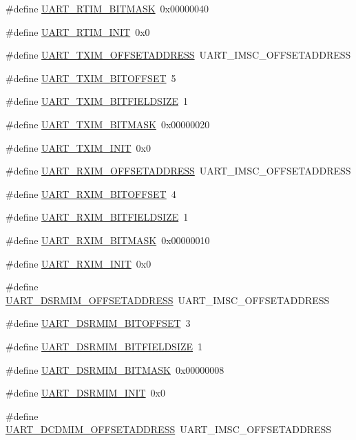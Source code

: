 \begin{DoxyCompactItemize}
\item 
\#define \hyperlink{a00575_ad7bf00b60838c3dfd9218e9eeca7b0ec}{UART\_\-RTIM\_\-BITMASK}~0x00000040
\item 
\#define \hyperlink{a00575_a3d1a7f72310c5ce29ef70199e4128b2e}{UART\_\-RTIM\_\-INIT}~0x0
\item 
\#define \hyperlink{a00575_aa73197a589b4d692d8a5d90ac7111316}{UART\_\-TXIM\_\-OFFSETADDRESS}~UART\_\-IMSC\_\-OFFSETADDRESS
\item 
\#define \hyperlink{a00575_a9732269606e7783cc0ff873d246391bd}{UART\_\-TXIM\_\-BITOFFSET}~5
\item 
\#define \hyperlink{a00575_adcd7b6190dd0ad984e4ee8e185bd4dc2}{UART\_\-TXIM\_\-BITFIELDSIZE}~1
\item 
\#define \hyperlink{a00575_a4b5adaed0f55f3503e76eb8ec0adc351}{UART\_\-TXIM\_\-BITMASK}~0x00000020
\item 
\#define \hyperlink{a00575_aa63c184a5b6142f51df0dacda54d49a8}{UART\_\-TXIM\_\-INIT}~0x0
\item 
\#define \hyperlink{a00575_adea6a35f8f1d9bd17d594651a9500feb}{UART\_\-RXIM\_\-OFFSETADDRESS}~UART\_\-IMSC\_\-OFFSETADDRESS
\item 
\#define \hyperlink{a00575_ad1d8486b526aa57a5d0b19a34b76f5cd}{UART\_\-RXIM\_\-BITOFFSET}~4
\item 
\#define \hyperlink{a00575_afc1f7641db425412c48a850e80047096}{UART\_\-RXIM\_\-BITFIELDSIZE}~1
\item 
\#define \hyperlink{a00575_a806b2a666dd4816efa0a7cc1007afe8d}{UART\_\-RXIM\_\-BITMASK}~0x00000010
\item 
\#define \hyperlink{a00575_aebce90e6979681d35d63fd23e9365a47}{UART\_\-RXIM\_\-INIT}~0x0
\item 
\#define \hyperlink{a00575_a77c7da0c4325657e15bc667bd71d14d5}{UART\_\-DSRMIM\_\-OFFSETADDRESS}~UART\_\-IMSC\_\-OFFSETADDRESS
\item 
\#define \hyperlink{a00575_a4c32e89a66faa5450857f98a2054df8b}{UART\_\-DSRMIM\_\-BITOFFSET}~3
\item 
\#define \hyperlink{a00575_aecc4b90c73282d0642debe10cf6d6183}{UART\_\-DSRMIM\_\-BITFIELDSIZE}~1
\item 
\#define \hyperlink{a00575_ab9062f3bd17bfc23e77f3155c186c257}{UART\_\-DSRMIM\_\-BITMASK}~0x00000008
\item 
\#define \hyperlink{a00575_a72b9f2dd8f68150f29ca22529bb5bf76}{UART\_\-DSRMIM\_\-INIT}~0x0
\item 
\#define \hyperlink{a00575_a2984be353b32cad1430971ddc5602c37}{UART\_\-DCDMIM\_\-OFFSETADDRESS}~UART\_\-IMSC\_\-OFFSETADDRESS

\end{DoxyCompactItemize}
